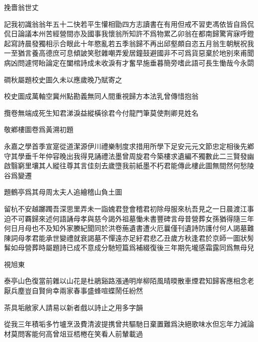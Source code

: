 \documentclass{zhvt-classic-Miya}
\begin{document}
\begin{fw}挽嗇翁世丈\end{fw}

記我初識翁翁年五十二快若平生懽相勖四方志讀書在有用但戒不習吏馮依皆自爲侃侃日論議本州苦經營間亦及國事我懷翁所知許不爲物累乙卯翁在都南歸驚宵寐呼鐙起寫詩晨發獨相示合眼此十年愍亂若五季翁歸不再出邱壑頗自恣五月翁生朝觥祝我一至猶言養高德庶可息傾詖笑慰雜嘲弄爰居鐘鼓避國非不可爲貨惡棄於地别來甫聞病凶問遽愕眙論定在闔棺詩成未收淚有才奮早施垂暮簡旁嗜此語可長生慟哉今永閟

\begin{fw}磵秋屬題校史圖久未以應歲晚乃賦寄之\end{fw}

校史圖成萬軸空冀州點勘義無同人間重視歸方本法乳曾傳惜抱翁

攬卷無端成死生知君涕淚益縱橫徐君今付龍門筆莫使荆卿見姓名

\begin{fw}敬鄕樓圖卷爲黃溯初題\end{fw}

永嘉之學首季宣寔從道潔源伊川禮樂制度求措用所學下足安元元文節忠定相後先鄕守其學垂千年仲容晚出我得見誦禮法墨曾周旋君今築樓求遺編不獨數此二三賢發幽啟翳窮里壤其人縱往尊其言佳刻去歲墮我前紙墨不朽君能傳此樓此圖無間然何愁陵谷爲變遷

\begin{fw}題鶴亭爲其母周太夫人追繪稽山負土圖\end{fw}

留杭不安越躑躅吾深思里弄未一詣媿君登會稽君初除母服來杭吾見之一日晨渡江事迫不可覉歸來述何語誦母孝與慈今謁外祖墓慟未書豐碑言母昔營葬女孫猶得隨三年何日月母也不及知外家賸紀聞同於洪卷葹遺書遭火厄曩僅刊遺詩防護付何人謁墓難陳詞母孝君能承世變禮就衰謁墓不憚遠亦足紆君悲乙丑歲方秋逢君於京師一圖狀髣髴如母營葬時屬題詩已成不意成分馳短篇爲補綴復後三年期先壠感霜露同爲無母兒

\begin{fw}視旭東\end{fw}

泰亭山色復當前雜以山花是杜鵑谿路漲通明岸柳陌風晴㬉散車煙君知歸客應相念老厭兵塵豈自賢尙幸兩家春事盛蜂喧蝶鬧任紛然

\begin{fw}茶具垢敝家人請易以新者戲以詩止之用多字韻\end{fw}

從我三年積垢多竹壚烹汲費清波提携曾共驅馳日棄置難爲決絕歌味水但忘年力減論材莫問客能何高曾俎豆桮棬在笑看人前輦載過
\end{document}
